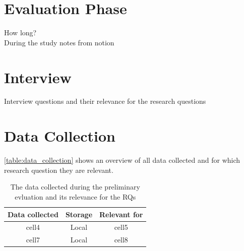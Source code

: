 \section{Evaluation Phase}
\label{section:evaluation}
How long? \\
During the study notes from notion

\section{Interview}
\label{section:interview}
Interview questions and their relevance for the research questions

\section{Data Collection}
\label{section:data_collection}
\autoref{table:data_collection} shows an overview of all data collected and for which research question they are relevant.

\begin{table}[h]
    \centering
    \begin{tabular}{ |c|c|c| }
        \hline
        Data collected & Storage & Relevant for \\
        \hline
        cell4          & Local   & cell5        \\
        cell7          & Local   & cell8        \\
        \hline
    \end{tabular}
    \caption{The data collected during the preliminary evluation and its relevance for the RQs}
    \label{table:data_collection}
\end{table}